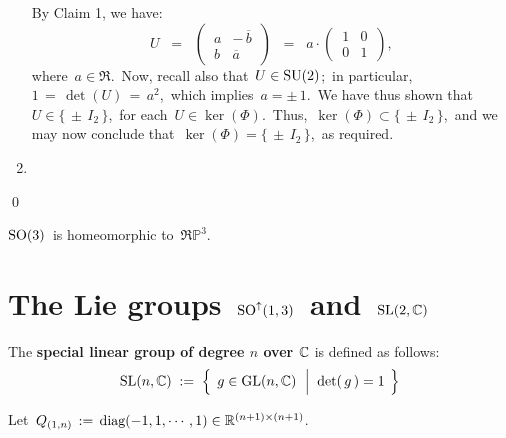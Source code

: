 \begin{enumerate}
	\vskip 0.3cm
	\noindent
	By Claim 1, we have:
	\begin{equation*}
	U
	\;\; = \;\;
		\left(\,\begin{array}{rr}
			a & -\,\overline{b}
			\\
			b & \overline{a}
			\end{array}\,\right)
	\;\; = \;\;
		a \cdot
		\left(\,\begin{array}{rr}
			1 & 0
			\\
			0 & 1
			\end{array}\,\right),
	\end{equation*}
	where \,$a \in \Re$.\,
	Now, recall also that \,$U \in \textnormal{SU}(2)$;\, in particular, \,$1 \,=\, \det(U) \,=\, a^{2}$,\,
	which implies \,$a = \pm\,1$.\,
	We have thus shown that \,$U \in \{\,\pm\,I_{2}\,\}$,\,
	for each \,$U \in \ker(\Phi)$.\,
	Thus, \,$\ker(\Phi) \subset \{\,\pm\,I_{2}\,\}$,\,
	and we may now conclude that \,$\ker(\Phi) = \{\,\pm\,I_{2}\,\}$,\,
	as required.
\item
\end{enumerate}
\qed


\vskip 0.5cm
\noindent
\begin{corollary}
\mbox{}
\vskip 0.05cm
\noindent
$\textnormal{SO}(3)$\, is homeomorphic to \,$\Re\mathbb{P}^{3}$.\,
\end{corollary}


\vskip 1.0cm
\section{The Lie groups \,$\textnormal{SO}^{\uparrow}(1,3)$\, and \,$\textnormal{SL}(2,\mathbb{C})$}


\vskip 0.3cm
\begin{definition}
\mbox{}
\vskip 0.1cm
\noindent
The \textbf{special linear group of degree $n$ over $\mathbb{C}$} is defined as follows:
\begin{equation*}
\SL(n,\C)
\; := \;
	\left\{\;\,
		g \overset{{\color{white}.}}{\in} \textnormal{GL}(n,\C)
		\;\,\left\vert\;\;
			\det(\,g\,) \overset{{\color{white}1}}{=} 1
			\right.
		\;\right\}
\end{equation*}
\end{definition}

\vskip 0.5cm
\noindent
Let \,$Q_{(1,n)} \,:=\, \textnormal{diag}(-1,1,\cdots,1) \in \mathbb{R}^{(n+1) \times (n+1)}$.

